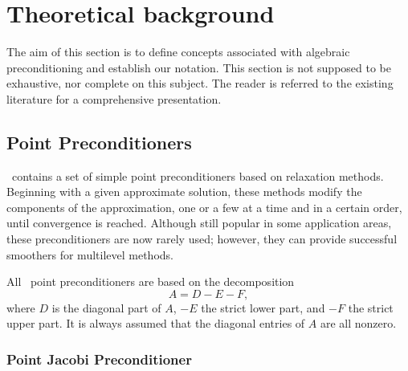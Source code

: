 \section{Theoretical background}
\label{sec:theo}

The aim of this section is to define concepts associated with algebraic
preconditioning and establish our notation. This section is not
supposed to be exhaustive, nor complete on this subject. The reader is
referred to the existing literature for a comprehensive presentation.

\medskip

\subsection{Point Preconditioners}
\label{sec:point}

\ifpack\ contains a set of simple point preconditioners based on relaxation
methods.
Beginning with a given approximate solution, these methods modify the
components of the approximation, one or a few at a time and in a certain order,
until convergence is reached. Although still popular in some application
areas, these preconditioners are now
rarely used; however, they can provide successful smoothers for multilevel
methods. 

All \ifpack\ point preconditioners are based on the decomposition
\begin{equation}
\label{eq:splitting}
A = D - E - F,
\end{equation}
where $D$ is the diagonal part of $A$, $-E$ the strict lower part, and 
$-F$ the strict upper part. It is always assumed that the diagonal entries of
$A$ are all nonzero.

\subsubsection{Point Jacobi Preconditioner}
\label{sec:jacobi}

